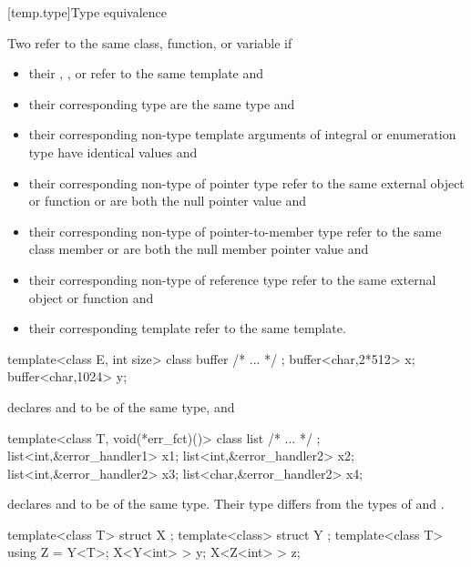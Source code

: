[temp.type]{Type equivalence}

\pnum
{}%
Two  refer to the same
class, function, or variable if
\begin{itemize}
\item {their ,
, or 
refer to the same template and}
\item {their corresponding type  are the
same type and}
\item {their corresponding non-type
template arguments of
integral or enumeration type have identical values and}
\item {their corresponding non-type  of
pointer type refer to the same external object or function or are both the null
pointer value and}
\item {their corresponding non-type  of
pointer-to-member type refer to the same class member or are both the null member
pointer value and}
\item {their corresponding non-type  of
reference type refer to the same external object or function and}
\item {their corresponding template  refer
to the same template.}
\end{itemize}
\enterexample

\begin{codeblock}
template<class E, int size> class buffer { /* ... */ };
buffer<char,2*512> x;
buffer<char,1024> y;
\end{codeblock}

declares
and
to be of the same type, and

\begin{codeblock}
template<class T, void(*err_fct)()> class list { /* ... */ };
list<int,&error_handler1> x1;
list<int,&error_handler2> x2;
list<int,&error_handler2> x3;
list<char,&error_handler2> x4;
\end{codeblock}

declares
and
to be of the same type.
Their type differs from the types of
and
.

\begin{codeblock}
template<class T> struct X { };
template<class> struct Y { };
template<class T> using Z = Y<T>;
X<Y<int> > y;
X<Z<int> > z;
\end{codeblock}

